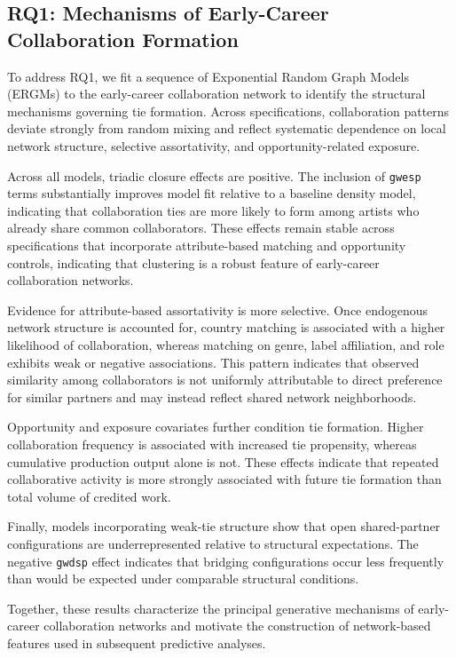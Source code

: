 \documentclass[fleqn,10pt]{wlscirep}
\begin{document}
\subsection*{RQ1: Mechanisms of Early-Career Collaboration Formation}

To address RQ1, we fit a sequence of Exponential Random Graph Models (ERGMs) to the early-career collaboration network to identify the structural mechanisms governing tie formation. Across specifications, collaboration patterns deviate strongly from random mixing and reflect systematic dependence on local network structure, selective assortativity, and opportunity-related exposure.

Across all models, triadic closure effects are positive. The inclusion of \texttt{gwesp} terms substantially improves model fit relative to a baseline density model, indicating that collaboration ties are more likely to form among artists who already share common collaborators. These effects remain stable across specifications that incorporate attribute-based matching and opportunity controls, indicating that clustering is a robust feature of early-career collaboration networks.

Evidence for attribute-based assortativity is more selective. Once endogenous network structure is accounted for, country matching is associated with a higher likelihood of collaboration, whereas matching on genre, label affiliation, and role exhibits weak or negative associations. This pattern indicates that observed similarity among collaborators is not uniformly attributable to direct preference for similar partners and may instead reflect shared network neighborhoods.

Opportunity and exposure covariates further condition tie formation. Higher collaboration frequency is associated with increased tie propensity, whereas cumulative production output alone is not. These effects indicate that repeated collaborative activity is more strongly associated with future tie formation than total volume of credited work.

Finally, models incorporating weak-tie structure show that open shared-partner configurations are underrepresented relative to structural expectations. The negative \texttt{gwdsp} effect indicates that bridging configurations occur less frequently than would be expected under comparable structural conditions.

Together, these results characterize the principal generative mechanisms of early-career collaboration networks and motivate the construction of network-based features used in subsequent predictive analyses.
\end{document}
